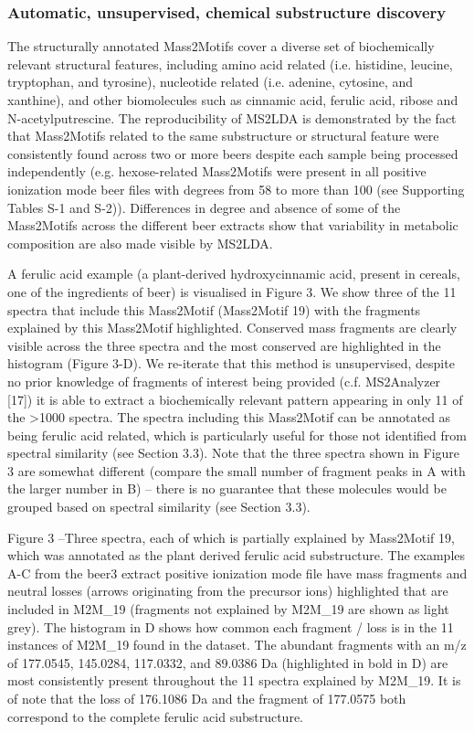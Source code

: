 \subsubsection{Automatic, unsupervised, chemical substructure discovery}

The structurally annotated Mass2Motifs cover a diverse set of biochemically relevant structural features, including amino acid related (i.e. histidine, leucine, tryptophan, and tyrosine), nucleotide related (i.e. adenine, cytosine, and xanthine), and other biomolecules such as cinnamic acid, ferulic acid, ribose and N-acetylputrescine. The reproducibility of MS2LDA is demonstrated by the fact that Mass2Motifs related to the same substructure or structural feature were consistently found across two or more beers despite each sample being processed independently (e.g. hexose-related Mass2Motifs were present in all positive ionization mode beer files with degrees from 58 to more than 100 (see Supporting Tables S-1 and S-2)). Differences in degree and absence of some of the Mass2Motifs across the different beer extracts show that variability in metabolic composition are also made visible by MS2LDA.

A ferulic acid example (a plant-derived hydroxycinnamic acid, present in cereals, one of the ingredients of beer) is visualised in Figure 3. We show three of the 11 spectra that include this Mass2Motif (Mass2Motif 19) with the fragments explained by this Mass2Motif highlighted. Conserved mass fragments are clearly visible across the three spectra and the most conserved are highlighted in the histogram (Figure 3-D). We re-iterate that this method is unsupervised, despite no prior knowledge of fragments of interest being provided (c.f. MS2Analyzer [17]) it is able to extract a biochemically relevant pattern appearing in only 11 of the >1000 spectra. The  spectra including this Mass2Motif can be annotated as being ferulic acid related, which is particularly useful for those not identified from spectral similarity (see Section 3.3). Note that the three spectra shown in Figure 3 are somewhat different (compare the small number of fragment peaks in A with the larger number in B) -- there is no guarantee that these molecules would be grouped based on spectral similarity (see Section 3.3).

Figure 3 –Three spectra, each of which is partially explained by Mass2Motif 19, which was annotated as the plant derived ferulic acid substructure. The examples A-C from the beer3 extract positive ionization mode file have mass fragments and neutral losses (arrows originating from the precursor ions) highlighted that are included in M2M_19 (fragments not explained by M2M_19 are shown as light grey). The histogram in D shows how common each fragment / loss is in the 11 instances of M2M_19 found in the dataset. The abundant fragments with an m/z of 177.0545, 145.0284, 117.0332, and 89.0386 Da (highlighted in bold in D) are most consistently present throughout the 11 spectra explained by M2M_19. It is of note that the loss of 176.1086 Da and the fragment of 177.0575 both correspond to the complete ferulic acid substructure.


